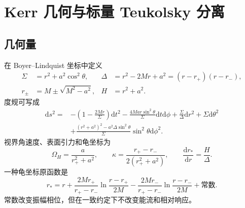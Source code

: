 \documentclass[UTF8,fontset=fandol,11pt,a4paper]{ctexart}
\newcommand{\dd}{\mathrm{d}}
\numberwithin{equation}{section}
\begin{document}
\section{Kerr 几何与标量 Teukolsky 分离}
\subsection{几何量}
在 Boyer--Lindquist 坐标中定义
\begin{align}
\Sigma&=r^2+a^2\cos^2\theta,& \Delta&=r^2-2Mr+a^2=(r-r_+)(r-r_-),\\
r_\pm&=M\pm\sqrt{M^2-a^2},& H&=r^2+a^2.
\end{align}
度规可写成
\begin{align}
\dd s^2={}&-\left(1-\frac{2Mr}{\Sigma}\right)\dd t^2
-\frac{4Mar\sin^2\theta}{\Sigma}\dd t\dd\phi
+\frac{\Sigma}{\Delta}\dd r^2+\Sigma\dd\theta^2\nonumber\\
&+\frac{(r^2+a^2)^2-a^2\Delta\sin^2\theta}{\Sigma}\sin^2\theta\dd\phi^2.
\end{align}
视界角速度、表面引力和龟坐标为
\begin{equation}
\Omega_H=\frac{a}{r_+^2+a^2},\qquad
\kappa=\frac{r_+-r_-}{2(r_+^2+a^2)},\qquad
\frac{\dd r_*}{\dd r}=\frac{H}{\Delta}.
\end{equation}
一种龟坐标原函数是
\begin{equation}
r_*=r+\frac{2Mr_+}{r_+-r_-}\ln\frac{r-r_+}{2M}
-\frac{2Mr_-}{r_+-r_-}\ln\frac{r-r_-}{2M}+\text{常数}.
\end{equation}
常数改变振幅相位，但在一致约定下不改变能流和相对响应。
\end{document}
